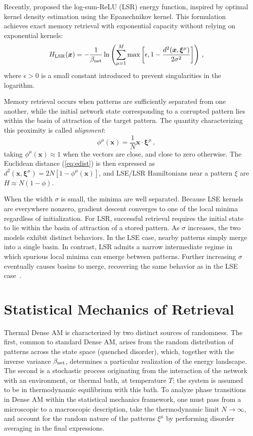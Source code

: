 \documentclass{article}
\theoremstyle{plain}
\theoremstyle{definition}
\theoremstyle{remark}
\begin{document}
Recently, \citet{hoover2025dense} proposed the log-sum-ReLU (LSR) energy function, inspired by optimal kernel density estimation using the Epanechnikov kernel. This formulation achieves exact memory retrieval with exponential capacity without relying on exponential kernels:
\begin{equation}
    H_{\rm LSR}(\bm{x}) = -\frac{1}{\beta_{\rm net}} \ln \left( \sum_{\mu=1}^M \max\left[\epsilon,  1 - \frac{d^2(\bm{x},\bm{\xi}^\mu)}{2\sigma^2} \right] \right) \,,
    \label{eq:H_lsr}
\end{equation}
where $\epsilon > 0$ is a small constant introduced to prevent singularities in the logarithm.

Memory retrieval occurs when patterns are sufficiently separated from one another, while the initial network state corresponding to a corrupted pattern lies within the basin of attraction of the target pattern. The quantity characterizing this proximity is called \textit{alignment}:
\begin{equation}
    \phi^\mu(\bm{x}) = \frac{1}{N} \bm{x} \cdot \bm{\xi}^\mu\,,
    \label{eq:alignment}
\end{equation}
taking $\phi^\mu(\bm{x}) \approx 1$ when the vectors are close, and close to zero otherwise. The Euclidean distance (\ref{eq:edist}) is then expressed as $d^2(\bm{x}, \bm{\xi}^\mu) =2N [1- \phi^\mu(\bm{x}) ]$, and 
LSE/LSR Hamiltonians near a pattern $\xi$ are $H\approx N(1-\phi)$.

When the width $\sigma$ is small, the minima are well separated. Because LSE kernels are everywhere nonzero, gradient descent converges to one of the local minima regardless of initialization. For LSR, successful retrieval requires the initial state to lie within the basin of attraction of a stored pattern. As $\sigma$ increases, the two models exhibit distinct behaviors. In the LSE case, nearby patterns simply merge into a single basin. In contrast, LSR admits a narrow intermediate regime in which spurious local minima can emerge between patterns. Further increasing $\sigma$ eventually causes basins to merge, recovering the same behavior as in the LSE case~\cite{hoover2025dense}.

\section{Statistical Mechanics of Retrieval}

Thermal Dense AM is characterized by two distinct sources of randomness. The first, common to standard Dense AM, arises from the random distribution of patterns across the state space (quenched disorder), which, together with the inverse variance $\beta_{\rm net}$, determines a particular realization of the energy landscape. The second is a stochastic process originating from the interaction of the network with an environment, or thermal bath, at temperature $T$; the system is assumed to be in thermodynamic equilibrium with this bath. To analyze phase transitions in Dense AM within the statistical mechanics framework, one must pass from a microscopic to a macroscopic description, take the thermodynamic limit $N \to \infty$, and account for the random nature of the patterns $\xi^\mu$ by performing disorder averaging in the final expressions.
\end{document}
